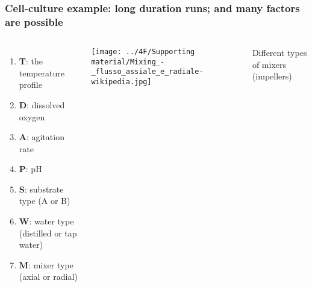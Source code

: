 \documentclass[handout,11pt,aspectratio=169,mathserif]{beamer}
\begin{document}
\begin{frame}\frametitle{Cell-culture example: long duration runs; and many factors are possible}
	\begin{columns}[c]
			\begin{enumerate}
				\item	\textbf{T}: the temperature profile
				\item	\textbf{D}: dissolved oxygen
				\item	\textbf{A}: agitation rate
				\item	\textbf{P}: pH
				\item	\textbf{S}: substrate type (A or B)
				\item	\textbf{W}: water type (distilled or tap water)
				\item	\textbf{M}: mixer type (axial or radial)
		
			\end{enumerate}
		
			
			
			\vspace{0.2cm}
			
			\centerline{\texttt{[image: ../4F/Supporting material/Mixing\_-\_flusso\_assiale\_e\_radiale-wikipedia.jpg]}}
			
			{\color{blue} \small Different types of mixers (impellers)} 
	\end{columns}
\end{frame}
\end{document}
